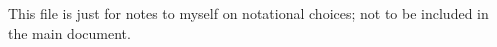 This file is just for notes to myself on notational choices; not to be included in the main document.